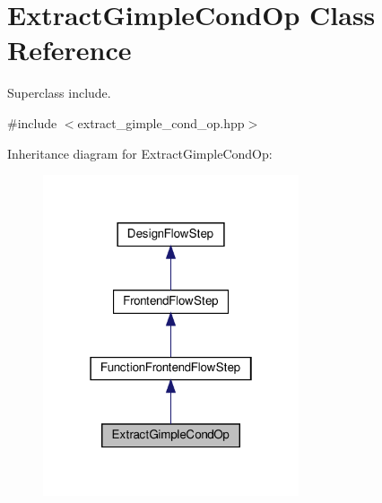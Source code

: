\hypertarget{classExtractGimpleCondOp}{}\section{Extract\+Gimple\+Cond\+Op Class Reference}
\label{classExtractGimpleCondOp}


Superclass include.  




{\ttfamily \#include $<$extract\+\_\+gimple\+\_\+cond\+\_\+op.\+hpp$>$}



Inheritance diagram for Extract\+Gimple\+Cond\+Op\+:
\nopagebreak
\begin{figure}[H]
\begin{center}
\leavevmode
\includegraphics[width=214pt]{d7/d29/classExtractGimpleCondOp__inherit__graph}
\end{center}
\end{figure}


